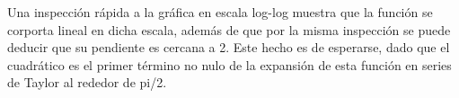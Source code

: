 \documentclass[11pt]{article}
\makeatletter
\newcommand{\boxspacing}{\kern\kvtcb@left@rule\kern\kvtcb@boxsep}
\newcommand{\prompt}[4]{
        {\ttfamily\llap{{\color{#2}[#3]:\hspace{3pt}#4}}\vspace{-\baselineskip}}
    }
\makeatother
\begin{document}
Una inspección rápida a la gráfica en escala log-log muestra que la
función se corporta lineal en dicha escala, además de que por la misma
inspección se puede deducir que su pendiente es cercana a 2. Este hecho
es de esperarse, dado que el cuadrático es el primer término no nulo de
la expansión de esta función en series de Taylor al rededor de pi/2.

    \begin{tcolorbox}[breakable, size=fbox, boxrule=1pt, pad at break*=1mm,colback=cellbackground, colframe=cellborder]
\prompt{In}{incolor}{ }{\boxspacing}
\begin{Verbatim}[commandchars=\\\{\}]

\end{Verbatim}
\end{tcolorbox}


    
    
    
\end{document}
